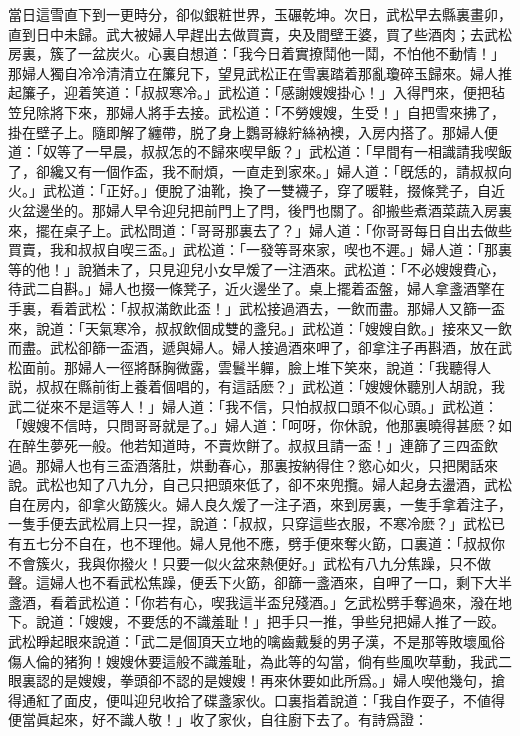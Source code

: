 當日這雪直下到一更時分，卻似銀粧世界，玉碾乾坤。次日，武松早去縣裏畫卯，直到日中未歸。武大被婦人早趕出去做買賣，央及間壁王婆，買了些酒肉；去武松房裏，簇了一盆炭火。心裏自想道：「我今日着實撩鬦他一鬦，不怕他不動情！」那婦人獨自冷冷清清立在簾兒下，望見武松正在雪裏踏着那亂瓊碎玉歸來。婦人推起簾子，迎着笑道：「叔叔寒冷。」武松道：「感謝嫂嫂掛心！」入得門來，便把毡笠兒除將下來，那婦人將手去接。武松道：「不勞嫂嫂，生受！」自把雪來拂了，掛在壁子上。隨即解了纏帶，脱了身上鸚哥綠紵絲衲襖，入房内搭了。那婦人便道：「奴等了一早晨，叔叔怎的不歸來喫早飯？」武松道：「早間有一相識請我喫飯了，卻纔又有一個作盃，我不耐煩，一直走到家來。」婦人道：「旣恁的，請叔叔向火。」武松道：「正好。」便脫了油靴，換了一雙襪子，穿了暖鞋，掇條凳子，自近火盆邊坐的。那婦人早令迎兒把前門上了閂，後門也關了。卻搬些煮酒菜蔬入房裏來，擺在桌子上。武松問道：「哥哥那裏去了？」婦人道：「你哥哥每日自出去做些買賣，我和叔叔自喫三盃。」武松道：「一發等哥來家，喫也不遲。」婦人道：「那裏等的他！」說猶未了，只見迎兒小女早煖了一注酒來。武松道：「不必嫂嫂費心，待武二自斟。」婦人也掇一條凳子，近火邊坐了。桌上擺着盃盤，婦人拿盞酒擎在手裏，看着武松：「叔叔滿飲此盃！」武松接過酒去，一飲而盡。那婦人又篩一盃來，說道：「天氣寒冷，叔叔飲個成雙的盞兒。」武松道：「嫂嫂自飲。」接來又一飲而盡。武松卻篩一盃酒，遞與婦人。婦人接過酒來呷了，卻拿注子再斟酒，放在武松面前。那婦人一徑將酥胸微露，雲鬟半軃，臉上堆下笑來，說道：「我聽得人説，叔叔在縣前街上養着個唱的，有這話麽？」武松道：「嫂嫂休聽別人胡說，我武二従來不是這等人！」婦人道：「我不信，只怕叔叔口頭不似心頭。」武松道：「嫂嫂不信時，只問哥哥就是了。」婦人道：「呵呀，你休說，他那裏曉得甚麽？如在醉生夢死一般。他若知道時，不賣炊餅了。叔叔且請一盃！」連篩了三四盃飲過。那婦人也有三盃酒落肚，烘動春心，那裏按納得住？慾心如火，只把閑話來說。武松也知了八九分，自己只把頭來低了，卻不來兜攬。婦人起身去盪酒，武松自在房内，卻拿火筯簇火。婦人良久煖了一注子酒，來到房裏，一隻手拿着注子，一隻手便去武松肩上只一捏，說道：「叔叔，只穿這些衣服，不寒冷麽？」武松已有五七分不自在，也不理他。婦人見他不應，劈手便來奪火筯，口裏道：「叔叔你不會簇火，我與你撥火！只要一似火盆來熱便好。」武松有八九分焦躁，只不做聲。這婦人也不看武松焦躁，便丢下火筯，卻篩一盞酒來，自呷了一口，剩下大半盞酒，看着武松道：「你若有心，喫我這半盃兒殘酒。」乞武松劈手奪過來，潑在地下。說道：「嫂嫂，不要恁的不識羞耻！」把手只一推，爭些兒把婦人推了一跤。武松睜起眼來說道：「武二是個頂天立地的噙齒戴髮的男子漢，不是那等敗壞風俗傷人倫的猪狗！嫂嫂休要這般不識羞耻，為此等的勾當，倘有些風吹草動，我武二眼裏認的是嫂嫂，拳頭卻不認的是嫂嫂！再來休要如此所爲。」婦人喫他幾句，搶得通紅了面皮，便叫迎兒收拾了碟盞家伙。口裏指着說道：「我自作耍子，不値得便當眞起來，好不識人敬！」收了家伙，自往廚下去了。有詩爲證：


